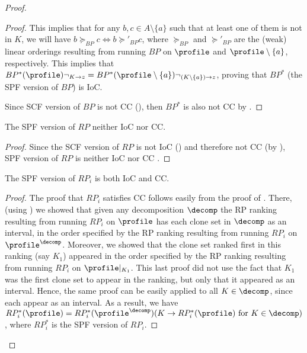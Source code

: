 \begin{proof}
\begin{proof}
This implies that for any $b,c \in A \setminus\{a\}$ such that at least one of them is not in $K$, we will have $b \succeq_{BP} c \iff b \succeq'_{BP} c$, where $\succeq_{BP}$ and $\succeq'_{BP}$ are the (weak) linear orderings resulting from running $BP$ on $\profile$ and $\profile \setminus \{a\}$, respectively. This implies that $ BP^*(\profile)\neg_{K \rightarrow z}= BP^*(\profile\setminus\{a\})\neg_{ (K \setminus\{a\}) \rightarrow z}$, proving that $BP^*$ (the SPF version of $BP$) is IoC.

Since SCF version of $BP$ is not CC (), then $BP^*$ is also not CC by .
\end{proof}

\begin{lemma}\label{lemma:spfrp}
    The SPF version of $RP$ neither IoC nor CC.
\end{lemma}
\begin{proof}
    Since the SCF version of $RP$ is not IoC () and therefore not CC (by ), SPF version of $RP$ is neither IoC nor CC .
\end{proof}

\begin{lemma}\label{lemma:spfrpi}
    The SPF version of $RP_i$ is both IoC and CC.
\end{lemma}
\begin{proof}
    The proof that $RP_i$ satisfies CC follows easily from the proof of . There, (using ) we showed that given any decomposition $\decomp$ the RP ranking resulting from running $RP_i$ on $\profile$ has each  clone set in $\decomp$ as an interval, in the order specified by the RP ranking resulting from running $RP_i$ on $\profile^\decomp$. Moreover, we showed that the clone set ranked first in this ranking (say $K_1$) appeared in the order  specified by the RP ranking resulting from running $RP_i$ on $\profile|_{K_1}$. This last proof did not use the fact that $K_1$ was the first clone set to appear in the ranking, but only that it appeared as an interval. Hence, the same proof can be easily applied to all $K \in \decomp$, since each appear as an interval. As a result, we have $RP^*_i(\profile)= RP^*_i(\profile^\decomp)(K \rightarrow RP^*_i(\profile)\text{ for }K\in \decomp)$, where $RP^*_i$ is the SPF version of  $RP_i$.
\end{proof}


\end{proof}
